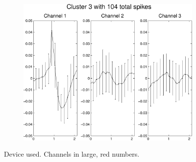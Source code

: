 \begin{center}
\begin{figure}
\begin{subfigure}[b]{.24\textwidth}
\caption{}
\end{subfigure}
\begin{subfigure}[b]{.24\textwidth}
\includegraphics[width=\textwidth]{../figs/3devim/clus3}
\caption{}
\end{subfigure}
\caption{Device used. Channels in large, red numbers.}
\end{figure}
\end{center}
